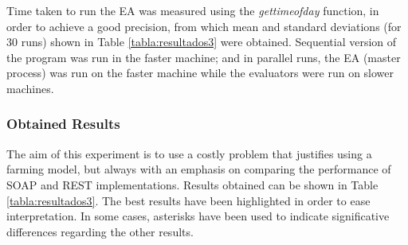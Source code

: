 \documentclass[final,1p,times]{elsarticle}
\begin{document}
Time taken to run the EA was measured using the \emph{gettimeofday} function, in order to achieve a good precision, from which mean and standard deviations (for 30 runs) shown in Table \ref{tabla:resultados3} were obtained.
Sequential version of the program was run in the faster machine; and in parallel runs, 
the EA (master process) was run on the faster machine while the evaluators were run on slower machines.




\subsubsection{Obtained Results}

The aim of this experiment  is to use a costly problem that justifies
using a farming model, but always with an emphasis on comparing the performance of SOAP and REST implementations.
Results obtained can be shown in Table \ref{tabla:resultados3}.
The best results have been highlighted in order to ease interpretation. In some cases, asterisks have been used to indicate significative differences regarding the other results.
\end{document}
